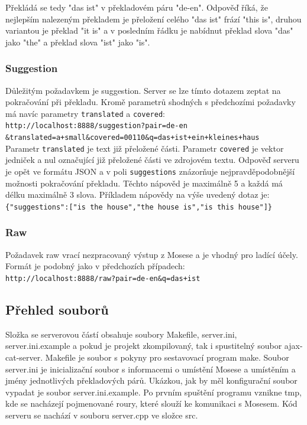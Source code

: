 \documentclass[12pt,a4paper]{report}
\begin{document}
Překládá se tedy "das ist" v překladovém páru "de-en". Odpověď říká, že nejlepším nalezeným překladem je přeložení celého "das ist" frází "this is", druhou variantou je překlad "it is" a v posledním řádku je nabídnut překlad slova "das" jako "the" a překlad slova "ist" jako "is".

\subsubsection{Suggestion}
Důležitým požadavkem je suggestion. Server se lze tímto dotazem zeptat na pokračování při překladu. Kromě parametrů shodných s předchozími požadavky má navíc parametry {\tt translated} a {\tt covered}: \\

{\tt http://localhost:8888/suggestion?pair=de-en \\ \&translated=a+small\&covered=00110\&q=das+ist+ein+kleines+haus } \\

Parametr {\tt translated} je text již přeložené části. Parametr {\tt covered} je vektor jedniček a nul označující již přeložené části ve zdrojovém textu. Odpověď serveru je opět ve formátu JSON a v poli {\tt suggestions} znázorňuje nejpravděpodobnější možnosti pokračování překladu. Těchto nápověd je maximálně 5 a každá má délku maximálně 3 slova. Příkladem nápovědy na výše uvedený dotaz je: \\

{\tt \{"suggestions":["is the house","the house is","is this house"]\} }

\subsubsection{Raw}
Požadavek raw vrací nezpracovaný výstup z Mosese a je vhodný pro ladící účely. Formát je podobný jako v předchozích případech: \\

{\tt http://localhost:8888/raw?pair=de-en\&q=das+ist } \\

\subsection{Přehled souborů}
Složka se serverovou částí obsahuje soubory Makefile, server.ini, server.ini.example a pokud je projekt zkompilovaný, tak i spustitelný soubor ajax-cat-server. Makefile je soubor s pokyny pro sestavovací program make. Soubor server.ini je inicializační soubor s informacemi o umístění Mosese a umístěním a jmény jednotlivých překladových párů. Ukázkou, jak by měl konfigurační soubor vypadat je soubor server.ini.example. Po prvním spuštění programu vznikne tmp, kde se nacházejí pojmenované roury, které slouží ke komunikaci s Mosesem. Kód serveru se nachází v souboru server.cpp ve složce src.
\end{document}
